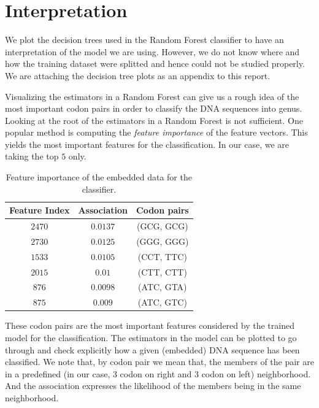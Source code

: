 \documentclass[oneside, twocolumn, a4paper, 10pt]{IEEEtran}
\begin{document}
\section{Interpretation} 
We plot the decision trees used in the Random Forest classifier to have an interpretation of the model we are using. However, we do not know where and how the training dataset were splitted and hence could not be studied properly. We are attaching the decision tree plots as an appendix to this report.\\
\par 
Visualizing the estimators in a Random Forest can give us a rough idea of the most important codon pairs in order to classify the DNA sequences into genus. Looking at the root of the estimators in a Random Forest is not sufficient. One popular method is computing the \textit{feature importance} of the feature vectors. This yields the most important features for the classification. In our case, we are taking the top $5$ only.
\begin{table}
\begin{center}
\begin{tabular}{|c|c|c|}
\hline
Feature Index & Association & Codon pairs\\ \hline
$2470$ & $0.0137$ & (GCG, GCG)\\ \hline
$2730$ & $0.0125$ & (GGG, GGG)\\ \hline
$1533$ & $0.0105$ & (CCT, TTC)\\ \hline
$2015$ & $0.01$ & (CTT, CTT)\\ \hline
$876$ & $0.0098$ & (ATC, GTA)\\ \hline
$875$ & $0.009$ & (ATC, GTC)\\ \hline
\end{tabular}
\caption{Feature importance of the embedded data for the classifier.}
\label{tab:featureimportance}
\end{center}
\end{table}
These codon pairs are the most important features considered by the trained model for the classification. The estimators in the model can be plotted to go through and check explicitly how a given (embedded) DNA sequence has been classified. We note that, by codon pair we mean that, the members of the pair are in a predefined (in our case, 3 codon on right and 3 codon on left) neighborhood. And the association expresses the likelihood of the members being in the same neighborhood.
\end{document}
